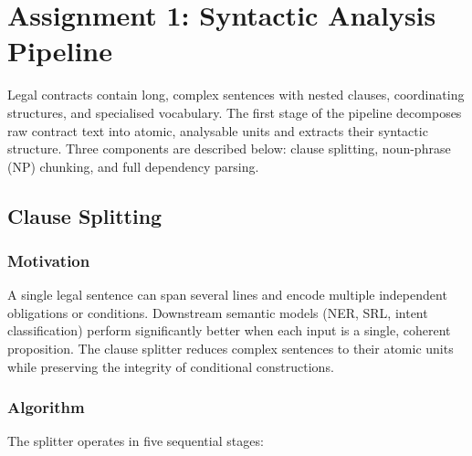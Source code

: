 \documentclass[assignment.tex]{subfiles}
\begin{document}
\chapter{Assignment 1: Syntactic Analysis Pipeline}
\label{sec:assignment1}

Legal contracts contain long, complex sentences with nested clauses, coordinating
structures, and specialised vocabulary.  The first stage of the pipeline decomposes
raw contract text into atomic, analysable units and extracts their syntactic
structure.  Three components are described below: clause splitting, noun-phrase (NP)
chunking, and full dependency parsing.

\section{Clause Splitting}
\label{subsec:clause-splitting}

\subsection{Motivation}

A single legal sentence can span several lines and encode multiple independent
obligations or conditions.  Downstream semantic models (NER, SRL, intent
classification) perform significantly better when each input is a single, coherent
proposition.  The clause splitter reduces complex sentences to their atomic units
while preserving the integrity of conditional constructions.

\subsection{Algorithm}

The splitter operates in five sequential stages:
\end{document}
